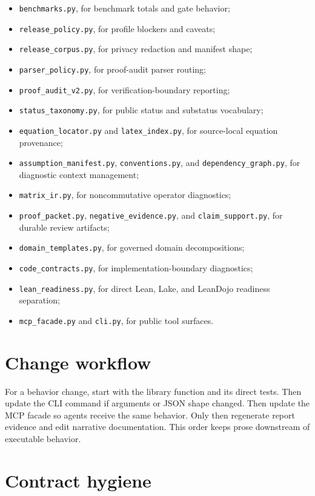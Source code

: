 \documentclass[12pt,a4paper,openany]{book}
\begin{document}
\begin{itemize}
  \item \texttt{benchmarks.py}, for benchmark totals and gate behavior;
  \item \texttt{release\_policy.py}, for profile blockers and caveats;
  \item \texttt{release\_corpus.py}, for privacy redaction and manifest shape;
  \item \texttt{parser\_policy.py}, for proof-audit parser routing;
  \item \texttt{proof\_audit\_v2.py}, for verification-boundary reporting;
  \item \texttt{status\_taxonomy.py}, for public status and substatus
        vocabulary;
  \item \texttt{equation\_locator.py} and \texttt{latex\_index.py}, for
        source-local equation provenance;
  \item \texttt{assumption\_manifest.py}, \texttt{conventions.py}, and
        \texttt{dependency\_graph.py}, for diagnostic context management;
  \item \texttt{matrix\_ir.py}, for noncommutative operator diagnostics;
  \item \texttt{proof\_packet.py}, \texttt{negative\_evidence.py}, and
        \texttt{claim\_support.py}, for durable review artifacts;
  \item \texttt{domain\_templates.py}, for governed domain decompositions;
  \item \texttt{code\_contracts.py}, for implementation-boundary diagnostics;
  \item \texttt{lean\_readiness.py}, for direct Lean, Lake, and LeanDojo
        readiness separation;
  \item \texttt{mcp\_facade.py} and \texttt{cli.py}, for public tool surfaces.
\end{itemize}

\section{Change workflow}

For a behavior change, start with the library function and its direct tests.
Then update the CLI command if arguments or JSON shape changed. Then update the
MCP facade so agents receive the same behavior. Only then regenerate report
evidence and edit narrative documentation. This order keeps prose downstream of
executable behavior.

\section{Contract hygiene}
\end{document}

